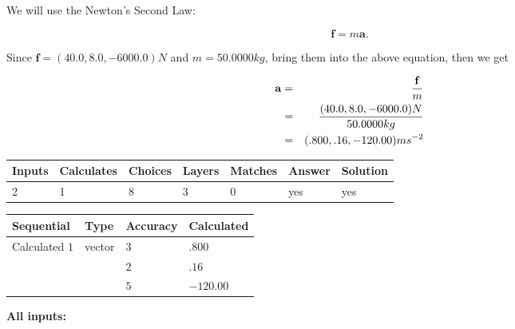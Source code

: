 \documentclass[12pt]{article}
\begin{document}
 

We will use the Newton's Second Law:
 
\[
\mathbf{f}=m\mathbf{a}.
\]
 
Since $\mathbf{f}= %
(40.0 , 8.0 , -6000.0) N$
and $m= %
50.0000kg$, bring them into the above equation, then we get
 
\begin{eqnarray*}
\mathbf{a}&=&\frac{\mathbf{f}}m  \\
&=&\frac{ %
(40.0 , 8.0 , -6000.0) N}{ %
50.0000kg}  \\
&=& %
(.800 , .16 , -120.00) ms^{-2}
\end{eqnarray*}
 
 
 
\noindent{}
 
 

 
\vspace{0.3in}
   
   
   
   
\noindent\begin{tabular}{|l|l|l|l|l|l|l|}
 \hline
Inputs & Calculates & Choices & Layers & Matches & Answer & Solution \\ \hline
           2 & 
           1 & 
           8
  & 
           3 & 
           0 & 
  yes & 
  yes 
  \\ \hline
 \end{tabular}
   
   
   
   
\noindent{}
   
   
  
  
\noindent\begin{tabular}{|l|l|l|l|}
\hline
 Sequential & Type & Accuracy & Calculated \\ 
\hline
 
 
  Calculated $           1$ & vector &  
  $           3 $ 
 &  $ .800 $ 
 \\    
  & & 
  $           2 $ 
 &  $ .16 $ 
 \\    
  & & 
  $           5 $ 
 &  $ -120.00 $ 
 \\  \hline  
 \end{tabular}
   
   
   
   
\noindent\vspace{0.1in}\hspace{-0.08in} {\textbf{\Large{All inputs: }}}
   
\end{document}
